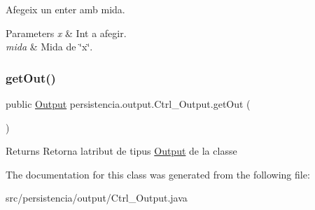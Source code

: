 Afegeix un enter amb mida. 


\begin{DoxyParams}{Parameters}
{\em x} & Int a afegir. \\
\hline
{\em mida} & Mida de \char`\"{}x\char`\"{}. \\
\hline
\end{DoxyParams}
\mbox{\label{classpersistencia_1_1output_1_1Ctrl__Output_aa36fdf4d9efc14d95f5d0d77838c6280}} 
\subsubsection{\texorpdfstring{get\+Out()}{getOut()}}
{\footnotesize\ttfamily public \hyperlink{classpersistencia_1_1output_1_1Output}{Output} persistencia.\+output.\+Ctrl\+\_\+\+Output.\+get\+Out (\begin{DoxyParamCaption}{ }\end{DoxyParamCaption})\hspace{0.3cm}{\ttfamily [inline]}}

\begin{DoxyReturn}{Returns}
Retorna l\textquotesingle{}atribut de tipus \hyperlink{classpersistencia_1_1output_1_1Output}{Output} de la classe 
\end{DoxyReturn}


The documentation for this class was generated from the following file\+:\begin{DoxyCompactItemize}
\item 
src/persistencia/output/Ctrl\+\_\+\+Output.\+java\end{DoxyCompactItemize}

